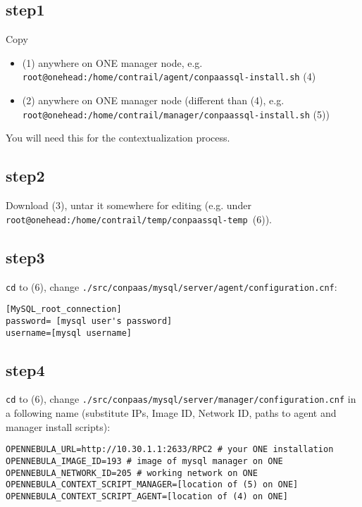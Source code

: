 \documentclass[a4paper,10pt]{article}
\begin{document}
\subsection*{step1}

Copy
\begin{itemize}
\item (1) anywhere on ONE manager node, e.g. \\ {\tt root@onehead:/home/contrail/agent/conpaassql-install.sh} (4)
\item (2) anywhere on ONE manager node (different than (4), e.g. \\ {\tt root@onehead:/home/contrail/manager/conpaassql-install.sh} (5))
\end{itemize}

You will need this for the contextualization process.

\subsection*{step2} 

Download (3), untar it somewhere for editing (e.g. under \\ {\tt root@onehead:/home/contrail/temp/conpaassql-temp }(6)).

\subsection*{step3}

{\tt cd} to (6), change {\tt ./src/conpaas/mysql/server/agent/configuration.cnf}:

\begin{Verbatim}[frame=single]
[MySQL_root_connection]
password= [mysql user's password]
username=[mysql username]
\end{Verbatim}

\subsection*{step4}

{\tt cd} to (6), change {\tt ./src/conpaas/mysql/server/manager/configuration.cnf} in a following name (substitute IPs, Image ID, Network ID, paths to agent and manager install scripts):

\begin{Verbatim}[frame=single]
OPENNEBULA_URL=http://10.30.1.1:2633/RPC2 # your ONE installation
OPENNEBULA_IMAGE_ID=193 # image of mysql manager on ONE
OPENNEBULA_NETWORK_ID=205 # working network on ONE
OPENNEBULA_CONTEXT_SCRIPT_MANAGER=[location of (5) on ONE]
OPENNEBULA_CONTEXT_SCRIPT_AGENT=[location of (4) on ONE]
\end{Verbatim}
\end{document}
